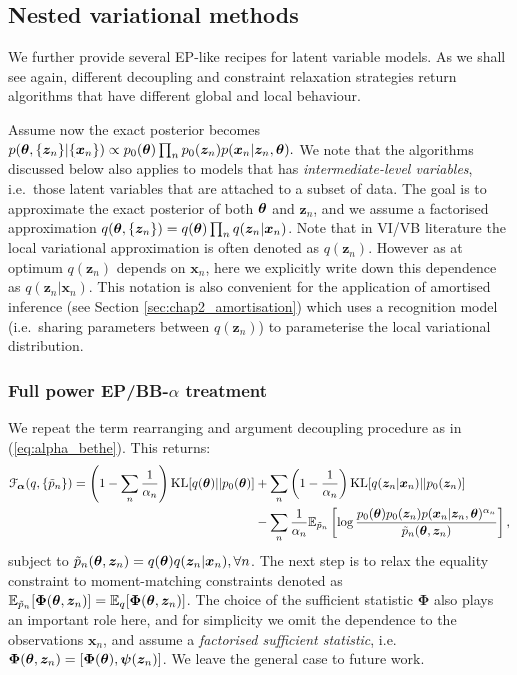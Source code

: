 
\subsection{Nested variational methods}
\label{sec:appendix_relaxation_lvm}
We further provide several EP-like recipes for latent variable models. As we shall see again, different decoupling and constraint relaxation strategies return algorithms that have different global and local behaviour. 

Assume now the exact posterior becomes
$p(\bm{\theta}, \{\bm{z}_n\} | \{ \bm{x}_n \}) \propto p_0(\bm{\theta}) \prod_n p_0(\bm{z}_n) p(\bm{x}_n|\bm{z}_n, \bm{\theta}).$ We note that the algorithms discussed below also applies to models that has \emph{intermediate-level variables}, i.e.~those latent variables that are attached to a subset of data. The goal is to approximate the exact posterior of both $\bm{\theta}$ and $\bm{z}_n$, and we assume a factorised approximation $q(\bm{\theta}, \{ \bm{z}_n \} ) = q(\bm{\theta}) \prod_n q(\bm{z}_n|\bm{x}_n)$. Note that in VI/VB literature the local variational approximation is often denoted as $q(\bm{z}_n)$. However as at optimum $q(\bm{z}_n)$ depends on $\bm{x}_n$, here we explicitly write down this dependence as $q(\bm{z}_n|\bm{x}_n)$. This notation is also convenient for the application of amortised inference (see Section \ref{sec:chap2_amortisation}) which uses a recognition model (i.e.~sharing parameters between $q(\bm{z}_n)$) to parameterise the local variational distribution.

\subsubsection{Full power EP/BB-$\alpha$ treatment}
We repeat the term rearranging and argument decoupling procedure as in (\ref{eq:alpha_bethe}). This returns:
\begin{equation}
\begin{aligned}
\mathcal{F}_{\bm{\alpha}}(q, \{ \tilde{p}_n \} ) = \left(1 - \sum_n \frac{1}{\alpha_n} \right) \mathrm{KL}[q(\bm{\theta})||p_0(\bm{\theta})] &+ \sum_n \left( 1 - \frac{1}{\alpha_n} \right) \mathrm{KL}[q(\bm{z}_n|\bm{x}_n)||p_0(\bm{z}_n)] \\
&- \sum_n \frac{1}{\alpha_n} \mathbb{E}_{\tilde{p}_n} \left[ \log \frac{p_0(\bm{\theta}) p_0(\bm{z}_n) p( \bm{x}_n | \bm{z}_n, \bm{\theta})^{\alpha_n}}{ \tilde{p}_n(\bm{\theta}, \bm{z}_n) } \right],
\end{aligned}
\label{eq:vi_lvm_rearrange}
\end{equation}
subject to $\tilde{p}_n(\bm{\theta}, \bm{z}_n) = q(\bm{\theta}) q(\bm{z}_n | \bm{x}_n), \forall n$.
%
The next step is to relax the equality constraint to moment-matching constraints denoted as $\mathbb{E}_{\tilde{p}_n}[\bm{\Phi}(\bm{\theta}, \bm{z}_n)] = \mathbb{E}_{q}[\bm{\Phi}(\bm{\theta}, \bm{z}_n)]$. The choice of the sufficient statistic $\bm{\Phi}$ also plays an important role here, and for simplicity we omit the dependence to the observations $\bm{x}_n$, and assume a \emph{factorised sufficient statistic}, i.e.~$\bm{\Phi}(\bm{\theta}, \bm{z}_n) = [\bm{\Phi}(\bm{\theta}), \bm{\psi}(\bm{z}_n)]$. We leave the general case to future work.


